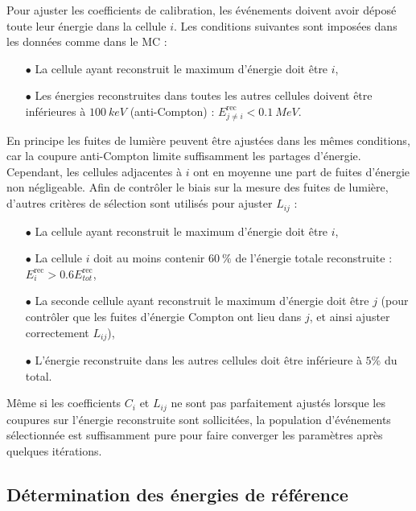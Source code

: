 \bigbreak

Pour ajuster les coefficients de calibration, les événements doivent avoir déposé toute leur énergie dans la cellule $i$. Les conditions suivantes sont imposées dans les données comme dans le MC :

\begin{itemize}
    \item[$\bullet$] La cellule ayant reconstruit le maximum d'énergie doit être $i$,
    \item[$\bullet$] Les énergies reconstruites dans toutes les autres cellules doivent être inférieures à $\SI{100}{keV}$ (anti-Compton) : $E^{\textrm{rec}}_{j\neq i} < \SI{0.1}{MeV}$.
\end{itemize}

\bigbreak

En principe les fuites de lumière peuvent être ajustées dans les mêmes conditions, car la coupure anti-Compton limite suffisamment  les partages d'énergie. Cependant, les cellules adjacentes à $i$ ont en moyenne une part de fuites d'énergie non négligeable. Afin de contrôler le biais sur la mesure des fuites de lumière, d'autres critères de sélection sont utilisés pour ajuster $L_{ij}$ :

 \begin{itemize}
    \item[$\bullet$] La cellule ayant reconstruit le maximum d'énergie doit être $i$,
    \item[$\bullet$] La cellule $i$ doit au moins contenir $\SI{60}{\%}$ de l'énergie totale reconstruite : $E^{\textrm{rec}}_{i} > 0.6E^{\textrm{rec}}_{tot}$,
    \item[$\bullet$] La seconde cellule ayant reconstruit le maximum d'énergie doit être $j$ (pour contrôler que les fuites d'énergie Compton ont lieu dans $j$, et ainsi ajuster correctement $L_{ij}$),
    \item[$\bullet$] L'énergie reconstruite dans les autres cellules doit être inférieure à $5 \%$ du total.\\
\end{itemize}

Même si les coefficients $C_i$ et $L_{ij}$ ne sont pas parfaitement ajustés lorsque les coupures sur l'énergie reconstruite sont sollicitées, la population d'événements sélectionnée est suffisamment pure pour faire converger les paramètres après quelques itérations.\\

\subsection{Détermination des énergies de référence}


